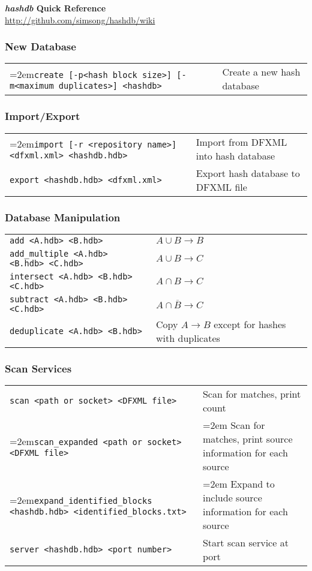 \documentclass[12pt]{article}
\newcommand{\hdb}{\emph{hashdb}\xspace}
\begin{document}
\begin{center}
\textbf{\Large \hdb Quick Reference} \\
\url{http://github.com/simsong/hashdb/wiki}
\end{center}

\subsubsection*{New Database}
\begin{tabular}{p{8 cm} p{9 cm} }
\hangindent=2em\texttt{create [-p<hash block size>] [-m<maximum duplicates>] <hashdb>} & Create a new hash database \\
\end{tabular}

\subsubsection*{Import/Export}
\begin{tabular}{p{8 cm} p{9 cm} }
\hangindent=2em\texttt{import [-r <repository name>] <dfxml.xml> <hashdb.hdb>} & Import from DFXML into hash database \\
\texttt{export <hashdb.hdb> <dfxml.xml>} & Export hash database to DFXML file \\
\end{tabular}

\subsubsection*{Database Manipulation}
\begin{tabular}{p{8 cm} p{9 cm} }
\texttt{add <A.hdb> <B.hdb>} & $A \cup B \rightarrow B$ \\
\texttt{add\_multiple <A.hdb> <B.hdb> <C.hdb>} & $A \cup B \rightarrow C$ \\
\texttt{intersect <A.hdb> <B.hdb> <C.hdb>} & $A \cap B \rightarrow C$ \\
\texttt{subtract <A.hdb> <B.hdb> <C.hdb>} & $A \cap \overline B \rightarrow C$ \\
\texttt{deduplicate <A.hdb> <B.hdb>} & Copy $A \rightarrow B$ except for hashes with duplicates \\
\end{tabular}

\subsubsection*{Scan Services}
\begin{tabular}{p{8 cm} p{9 cm} }
\texttt{scan <path or socket> <DFXML file>} & Scan for matches, print count\\
\hangindent=2em\texttt{scan\_expanded <path or socket> <DFXML file>} & \hangindent=2em Scan for matches, print source information for each source \\
\hangindent=2em\texttt{expand\_identified\_blocks <hashdb.hdb> <identified\_blocks.txt>} & \hangindent=2em Expand to include source information for each source \\
\texttt{server <hashdb.hdb> <port number>} & Start scan service at port \\
\end{tabular}
\end{document}
